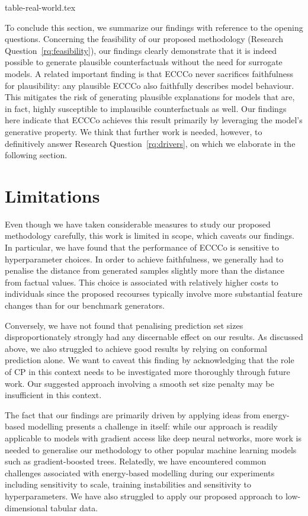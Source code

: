 \documentclass{article}
\begin{document}
{table-real-world.tex}

To conclude this section, we summarize our findings with reference to the opening questions. Concerning the feasibility of our proposed methodology (Research Question~\ref{rq:feasibility}), our findings clearly demonstrate that it is indeed possible to generate plausible counterfactuals without the need for surrogate models. A related important finding is that ECCCo never sacrifices faithfulness for plausibility: any plausible ECCCo also faithfully describes model behaviour. This mitigates the risk of generating plausible explanations for models that are, in fact, highly susceptible to implausible counterfactuals as well. Our findings here indicate that ECCCo achieves this result primarily by leveraging the model's generative property. We think that further work is needed, however, to definitively answer Research Question~\ref{rq:drivers}, on which we elaborate in the following section. 

\section{Limitations}

Even though we have taken considerable measures to study our proposed methodology carefully, this work is limited in scope, which caveats our findings. In particular, we have found that the performance of ECCCo is sensitive to hyperparameter choices. In order to achieve faithfulness, we generally had to penalise the distance from generated samples slightly more than the distance from factual values. This choice is associated with relatively higher costs to individuals since the proposed recourses typically involve more substantial feature changes than for our benchmark generators.

Conversely, we have not found that penalising prediction set sizes disproportionately strongly had any discernable effect on our results. As discussed above, we also struggled to achieve good results by relying on conformal prediction alone. We want to caveat this finding by acknowledging that the role of CP in this context needs to be investigated more thoroughly through future work. Our suggested approach involving a smooth set size penalty may be insufficient in this context. 

The fact that our findings are primarily driven by applying ideas from energy-based modelling presents a challenge in itself: while our approach is readily applicable to models with gradient access like deep neural networks, more work is needed to generalise our methodology to other popular machine learning models such as gradient-boosted trees. Relatedly, we have encountered common challenges associated with energy-based modelling during our experiments including sensitivity to scale, training instabilities and sensitivity to hyperparameters. We have also struggled to apply our proposed approach to low-dimensional tabular data. 
\end{document}
